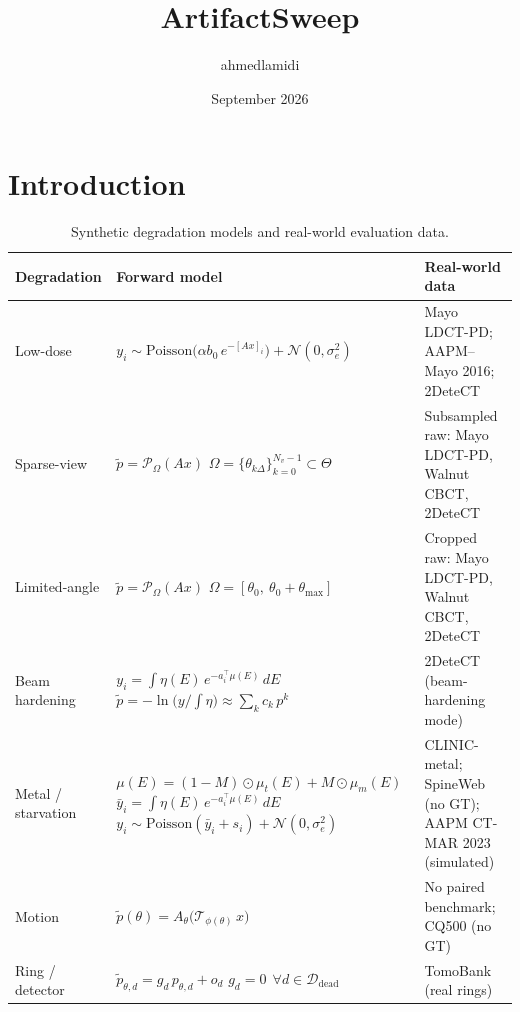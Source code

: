 \documentclass{article}
\title{ArtifactSweep}
\author{ahmedlamidi}
\date{September 2026}
\begin{document}
\maketitle

\section{Introduction}

\begin{table}[htbp]
\centering
\footnotesize
\renewcommand{\arraystretch}{1.3}
\setlength{\tabcolsep}{4pt}
\caption{Synthetic degradation models and real-world evaluation data.}
\label{tab:degradations}
\begin{tabularx}{\linewidth}{@{}>{\raggedright\arraybackslash}p{1.9cm} Y{1.2} Y{0.8}@{}}
\toprule
\textbf{Degradation} & \textbf{Forward model} & \textbf{Real-world data} \\
\midrule
Low-dose &
$y_i \sim \mathrm{Poisson}\big(\alpha b_0\, e^{-[Ax]_i}\big) + \mathcal{N}(0,\sigma_e^2)$ &
Mayo LDCT-PD; AAPM--Mayo 2016; 2DeteCT \\
\addlinespace
Sparse-view &
$\tilde p = \mathcal{P}_{\Omega}(Ax)$ \newline
$\Omega = \{\theta_{k\Delta}\}_{k=0}^{N_v-1} \subset \Theta$ &
Subsampled raw: Mayo LDCT-PD, Walnut CBCT, 2DeteCT \\
\addlinespace
Limited-angle &
$\tilde p = \mathcal{P}_{\Omega}(Ax)$ \newline
$\Omega = [\theta_0,\ \theta_0 + \theta_{\max}]$ &
Cropped raw: Mayo LDCT-PD, Walnut CBCT, 2DeteCT \\
\addlinespace
Beam hardening &
$y_i = \int \eta(E)\, e^{-a_i^\top \mu(E)}\, dE$ \newline
$\tilde p = -\ln\big(y / \textstyle\int \eta\big) \approx \sum_k c_k\, p^k$ &
2DeteCT (beam-hardening mode) \\
\addlinespace
Metal / starvation &
$\mu(E) = (1-M)\odot\mu_t(E) + M\odot\mu_m(E)$ \newline
$\bar y_i = \int \eta(E)\, e^{-a_i^\top \mu(E)}\, dE$ \newline
$y_i \sim \mathrm{Poisson}(\bar y_i + s_i) + \mathcal{N}(0,\sigma_e^2)$ &
CLINIC-metal; SpineWeb (no GT); AAPM CT-MAR 2023 (simulated) \\
\addlinespace
Motion &
$\tilde p(\theta) = A_\theta\big(\mathcal{T}_{\phi(\theta)}\, x\big)$ &
No paired benchmark; CQ500 (no GT) \\
\addlinespace
Ring / detector &
$\tilde p_{\theta,d} = g_d\, p_{\theta,d} + o_d$ \newline
$g_d = 0 \ \ \forall d \in \mathcal{D}_{\text{dead}}$ &
TomoBank (real rings) \\
\bottomrule
\end{tabularx}


\end{table}
\end{document}

